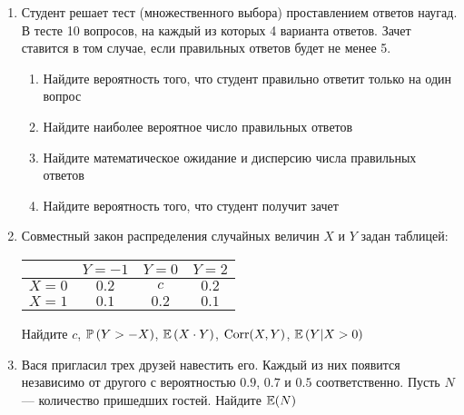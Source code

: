 \begin{enumerate}

\item Студент решает тест (множественного выбора) проставлением
ответов наугад. В тесте 10 вопросов, на каждый из которых 4
варианта ответов. Зачет ставится в том случае, если правильных
ответов будет не менее 5.
\begin{enumerate}
\item Найдите вероятность того, что студент правильно ответит только
на один вопрос
\item Найдите наиболее вероятное число правильных ответов
\item Найдите математическое ожидание и дисперсию числа правильных
ответов
\item Найдите вероятность того, что студент получит зачет
\end{enumerate}


\item Совместный закон распределения случайных величин  $X$  и  $Y$
задан таблицей:

\begin{tabular}{@{}cccc@{}}
\toprule
    & $Y=-1$ & $Y=0$ & $Y=2$ \\ \midrule
$X=0$ & $0.2$  & $c$   & $0.2$ \\
$X=1$ & $0.1$  & $0.2$ & $0.1$ \\ \bottomrule
\end{tabular}


Найдите  $c$,  $\P\left(Y>-X\right)$,  $\E\left(X\cdot Y \right)$, $\Corr(X,Y)$, $\E\left(Y|X>0\right)$

\item Вася пригласил трех друзей навестить его. Каждый из них появится
независимо от другого с вероятностью $0.9$, $0.7$ и $0.5$
соответственно. Пусть $N$ — количество пришедших гостей. Найдите $\E(N)$



\end{enumerate}
